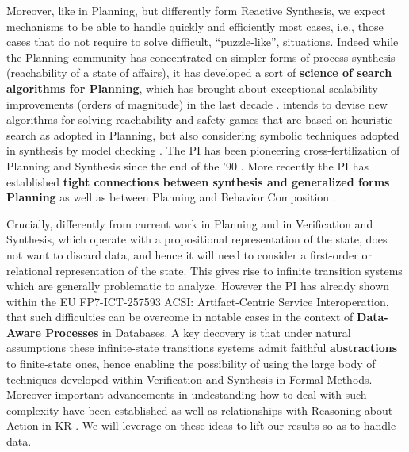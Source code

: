Moreover, like in Planning, but differently form Reactive Synthesis,
we expect mechanisms to be able to handle quickly and efficiently most
cases, i.e., those cases that do not require to solve difficult,
``puzzle-like'', situations. Indeed while the Planning community has
concentrated on simpler forms of process synthesis (reachability of a
state of affairs), it has developed a sort of \textbf{science of search
  algorithms for Planning}, which has brought about exceptional
scalability improvements (orders of magnitude) in the last decade
\cite{PommereningHB17,SteinmetzH17,LipovetzkyG17,DeGMMP17}. \project
intends to devise new algorithms for solving reachability and safety
games that are based on heuristic search as adopted in Planning, but
also considering symbolic techniques adopted in synthesis by model
checking \cite{BloemJPPS12}.
The PI has been pioneering cross-fertilization of Planning and
Synthesis since the end of the '90
\cite{DeGiacomoV99,CalvaneseGV02,SardinaGLL06,DeGiacomoFPS10,PatriziLGG11,DeGMMP17}. More
recently the PI has established \textbf{tight connections between
  synthesis and generalized forms Planning}
\cite{HuG11,HuG13,DeGiacomoMRS16,BDGR17} as well as between Planning
and Behavior Composition
\cite{SardinaG08,DePS13,DeGGPSS16,CalvaneseGLV16}.  

Crucially, differently from current work in Planning and in
Verification and Synthesis, which operate with a propositional
representation of the state, \project does not want to discard data, and hence
it will need to consider a first-order or relational representation of
the state. This gives rise to infinite transition systems which are generally problematic to analyze.
However the PI
has already shown within the EU FP7-ICT-257593 ACSI: Artifact-Centric
Service Interoperation, that such difficulties can be overcome in
notable cases
\cite{BerardiCGHM05,CalvaneseGHS09,HaririCGDM13,CalvaneseGMP13} in the context of \textbf{Data-Aware Processes} in Databases. A key
decovery is that under natural assumptions these infinite-state
transitions systems admit faithful \textbf{abstractions} to
finite-state ones, hence enabling the possibility of using the large
body of techniques developed within  Verification and Synthesis in
Formal Methods. Moreover important advancements in undestanding how to
deal with such complexity have been established as well as
relationships with Reasoning about Action in KR
\cite{HaririCMGMF13,BelardinelliLP14,CalvaneseGS15,CDMP17,BanihashemiGL17}.
We will leverage on these ideas to lift our results so
as to handle data.


